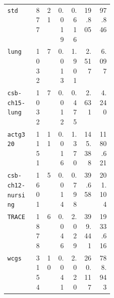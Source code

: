 \begin{longtable}{@{}p{0.25\linewidth}rrrrrr@{}}
\nolinkurl{std} & 877 & 21 & 0.019 & 0.616 & 19.805 & 97.846 \\
\nolinkurl{lung} & 1032 & 7 & 0.013 & 1.901 & 2.517 & 6.097 \\
\nolinkurl{csb-ch15-lung} & 1032 & 7 & 0.012 & 0.475 & 2.631 & 4.240 \\
\nolinkurl{actg320} & 1151 & 11 & 0.016 & 1.370 & 145.388 & 1180.621 \\
\nolinkurl{csb-ch12-nursing} & 1601 & 5 & 0.014 & 0.798 & 39.658 & 201.104 \\
\nolinkurl{TRACE} & 1878 & 6 & 0.046 & 2.029 & 399.441 & 1933.616 \\
\nolinkurl{wcgs} & 3154 & 10 & 0.041 & 2.020 & 260.117 & 788.943 \\
\bottomrule
\end{longtable}
\endgroup